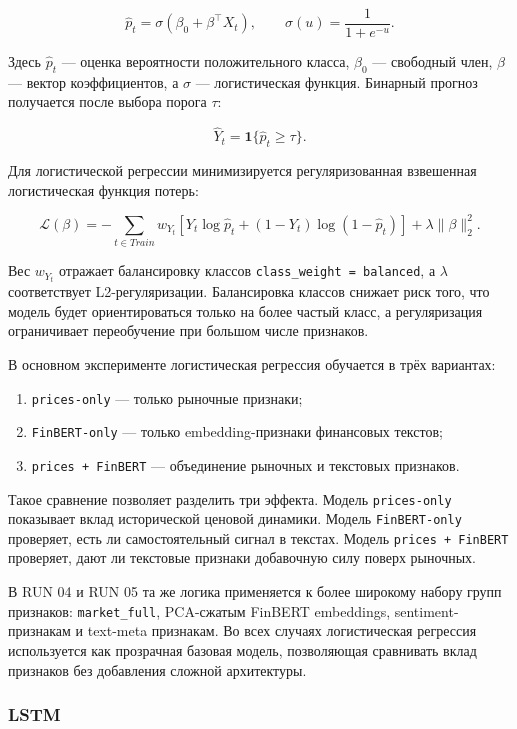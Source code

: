 \[
\widehat{p}_{t} =
\sigma(\beta_0 + \beta^\top X_t),
\qquad
\sigma(u)=\frac{1}{1+e^{-u}}.
\]

Здесь $\widehat{p}_{t}$ --- оценка вероятности положительного класса, $\beta_0$ --- свободный член, $\beta$ --- вектор коэффициентов, а $\sigma$ --- логистическая функция. Бинарный прогноз получается после выбора порога $\tau$:

\[
\widehat{Y}_t = \mathbf{1}\{\widehat{p}_t \geq \tau\}.
\]

Для логистической регрессии минимизируется регуляризованная взвешенная логистическая функция потерь:

\[
\mathcal{L}(\beta)
=
-\sum_{t \in Train}
w_{Y_t}
\left[
Y_t \log \widehat{p}_t
+
(1-Y_t)\log(1-\widehat{p}_t)
\right]
+
\lambda \|\beta\|_2^2.
\]

Вес $w_{Y_t}$ отражает балансировку классов \texttt{class\_weight = balanced}, а $\lambda$ соответствует L2-регуляризации. Балансировка классов снижает риск того, что модель будет ориентироваться только на более частый класс, а регуляризация ограничивает переобучение при большом числе признаков.

В основном эксперименте логистическая регрессия обучается в трёх вариантах:

\begin{enumerate}
    \item \texttt{prices-only} --- только рыночные признаки;
    \item \texttt{FinBERT-only} --- только embedding-признаки финансовых текстов;
    \item \texttt{prices + FinBERT} --- объединение рыночных и текстовых признаков.
\end{enumerate}

Такое сравнение позволяет разделить три эффекта. Модель \texttt{prices-only} показывает вклад исторической ценовой динамики. Модель \texttt{FinBERT-only} проверяет, есть ли самостоятельный сигнал в текстах. Модель \texttt{prices + FinBERT} проверяет, дают ли текстовые признаки добавочную силу поверх рыночных.

В RUN 04 и RUN 05 та же логика применяется к более широкому набору групп признаков: \texttt{market\_full}, PCA-сжатым FinBERT embeddings, sentiment-признакам и text-meta признакам. Во всех случаях логистическая регрессия используется как прозрачная базовая модель, позволяющая сравнивать вклад признаков без добавления сложной архитектуры.

\subsubsection{LSTM}

